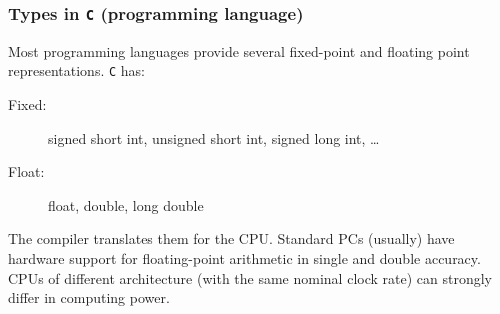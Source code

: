 \documentclass[11pt,compress,t,notes=noshow, xcolor=table]{beamer}
\begin{document}
\begin{vbframe}
\frametitle{Types in \texttt{C} (programming language)}
Most programming languages provide several fixed-point and floating point representations. \texttt{C} has:
\begin{description}
\item[Fixed:] signed short int, unsigned short int, signed long int, \ldots
\item[Float:] float, double, long double
\end{description}
The compiler translates them for the CPU. Standard PCs (usually) have hardware support for floating-point arithmetic in
single and double accuracy. CPUs of different architecture
(with the same nominal clock rate) can strongly differ in
computing power.



%
%
%


\end{vbframe}
\end{document}
